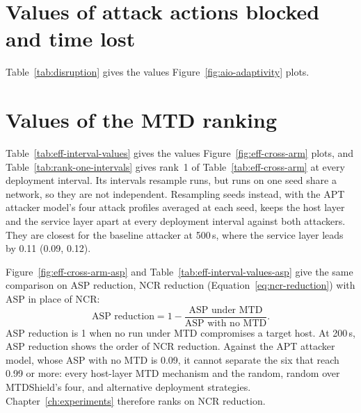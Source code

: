 \documentclass{cshonours}
\begin{document}
\section{Values of attack actions blocked and time lost}
\label{app:sup-disruption}

Table~\ref{tab:disruption} gives the values Figure~\ref{fig:aio-adaptivity} plots.



\FloatBarrier

\section{Values of the MTD ranking}
\label{app:sup-mtd-effect}

Table~\ref{tab:eff-interval-values} gives the values Figure~\ref{fig:eff-cross-arm}
plots, and Table~\ref{tab:rank-one-intervals} gives
rank~1 of Table~\ref{tab:eff-cross-arm} at every deployment interval.
Its intervals resample runs, but runs on one seed share a network, so they
are not independent. Resampling seeds instead, with the APT attacker
model's four attack profiles averaged at each seed, keeps the host layer and the
service layer apart at every deployment interval against both
attackers. They are closest for the baseline attacker at 500\,s, where the
service layer leads by 0.11 (0.09, 0.12).





Figure~\ref{fig:eff-cross-arm-asp} and
Table~\ref{tab:eff-interval-values-asp} give the same comparison on ASP
reduction, NCR reduction (Equation~\ref{eq:ncr-reduction}) with ASP in place of
NCR:
\begin{equation}
  \text{ASP reduction} = 1 -
  \frac{\text{ASP under MTD}}{\text{ASP with no MTD}}.
  \label{eq:asp-reduction}
\end{equation}
ASP reduction is 1 when no run under MTD compromises a target host. At
200\,s, ASP reduction shows the order of NCR reduction. Against the APT attacker model, whose ASP with no MTD
is 0.09, it cannot separate the six that reach 0.99 or more: every host-layer
MTD mechanism and the random, random over MTDShield's four, and alternative deployment strategies.
Chapter~\ref{ch:experiments} therefore ranks on NCR reduction.
\end{document}

